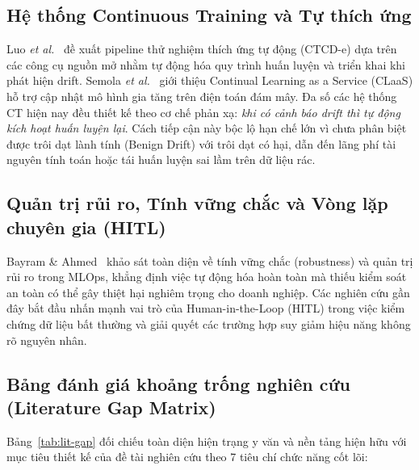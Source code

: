 \subsection{Hệ thống Continuous Training và Tự thích ứng}
Luo \textit{et al.}~\cite{luo2023} đề xuất pipeline thử nghiệm thích ứng tự động (CTCD-e) dựa trên các công cụ nguồn mở nhằm tự động hóa quy trình huấn luyện và triển khai khi phát hiện drift. Semola \textit{et al.}~\cite{semola2023} giới thiệu Continual Learning as a Service (CLaaS) hỗ trợ cập nhật mô hình gia tăng trên điện toán đám mây. Đa số các hệ thống CT hiện nay đều thiết kế theo cơ chế phản xạ: \emph{khi có cảnh báo drift thì tự động kích hoạt huấn luyện lại}. Cách tiếp cận này bộc lộ hạn chế lớn vì chưa phân biệt được trôi dạt lành tính (Benign Drift) với trôi dạt có hại, dẫn đến lãng phí tài nguyên tính toán hoặc tái huấn luyện sai lầm trên dữ liệu rác.

\subsection{Quản trị rủi ro, Tính vững chắc và Vòng lặp chuyên gia (HITL)}
Bayram \& Ahmed~\cite{bayram2025} khảo sát toàn diện về tính vững chắc (robustness) và quản trị rủi ro trong MLOps, khẳng định việc tự động hóa hoàn toàn mà thiếu kiểm soát an toàn có thể gây thiệt hại nghiêm trọng cho doanh nghiệp. Các nghiên cứu gần đây bắt đầu nhấn mạnh vai trò của Human-in-the-Loop (HITL) trong việc kiểm chứng dữ liệu bất thường và giải quyết các trường hợp suy giảm hiệu năng không rõ nguyên nhân.

\subsection{Bảng đánh giá khoảng trống nghiên cứu (Literature Gap Matrix)}

Bảng~\ref{tab:lit-gap} đối chiếu toàn diện hiện trạng y văn và nền tảng hiện hữu với mục tiêu thiết kế của đề tài nghiên cứu theo 7 tiêu chí chức năng cốt lõi:

